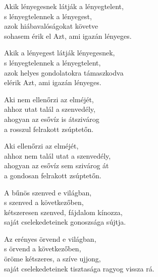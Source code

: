 \begin{dhpverse}

 Akik lényegesnek látják a lényegtelent,\\
s lényegtelennek a lényegest,\\
azok hiábavalóságokat követve\\
sohasem érik el Azt, ami igazán lényeges.

 Akik a lényegest látják lényegesnek,\\
s lényegtelennek a lényegtelent,\\
azok helyes gondolatokra támaszkodva\\
elérik Azt, ami igazán lényeges.

 Aki nem ellenőrzi az elméjét,\\
ahhoz utat talál a szenvedély,\\
ahogyan az esővíz is átszivárog\\
a rosszul felrakott zsúptetőn.

 Aki ellenőrzi az elméjét,\\
ahhoz nem talál utat a szenvedély,\\
ahogyan az esővíz sem szivárog át\\
a gondosan felrakott zsúptetőn.

 A bűnös szenved e világban,\\
s szenved a következőben,\\
kétszeresen szenved, fájdalom kínozza,\\
saját cselekedeteinek gonoszsága sújtja.

 Az erényes örvend e világban,\\
s örvend a következőben,\\
öröme kétszeres, a szíve ujjong,\\
saját cselekedeteinek tisztasága ragyog vissza rá.

\end{dhpverse}
\newpage
